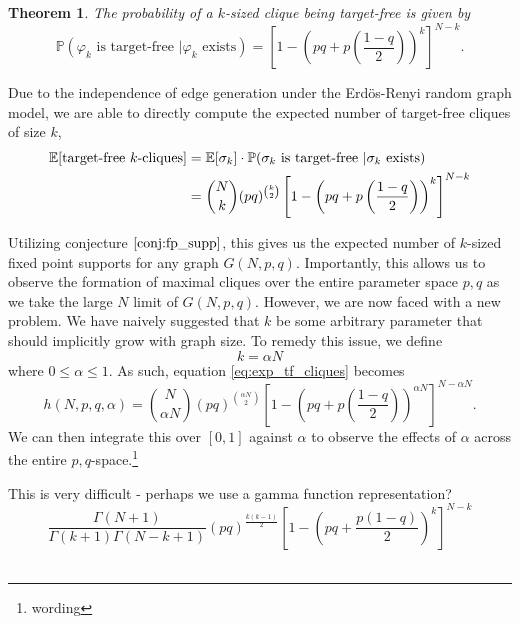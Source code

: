 \documentclass[psamsfonts]{amsart}
\newcommand{\E}{\mathbb{E}}
\newcommand{\PP}{\mathbb{P}}
\newtheorem{thm}{Theorem}[section]
\theoremstyle{definition}
\theoremstyle{remark}
\numberwithin{equation}{section}
\begin{document}
\begin{thm}
  The probability of a $k$-sized clique being target-free is given by
  \begin{equation}
    \label{eq:p_targetfree_directed}
    \PP(\varphi_k \mbox{ is target-free }|\varphi_k \mbox{ exists}) = \left[ 1- \left(pq + p   \left(\frac{1-q}{2} \right) \right)^k \right]^{N-k}.
  \end{equation}
\end{thm}

Due to the independence of edge generation under the Erd{\"o}s-Renyi random graph model, we are able to directly compute the expected number of target-free cliques of size $k$,
\begin{align}
  \label{eq:exp_tf_cliques}
  \E[\mbox{target-free } k\mbox{-cliques}] &= \E[\sigma_k] \cdot \PP(\sigma_k \mbox{ is target-free }|\sigma_k \mbox{ exists})
  \\
  & = \binom{N}{k}(pq)^{\binom{k}{2}} \left[ 1- \left(pq + p   \left(\frac{1-q}{2} \right) \right)^k \right]^{N-k} \notag
\end{align}

Utilizing conjecture $\ref{conj:fp_supp}$, this gives us the expected number of $k$-sized fixed point supports for any graph $G(N,p,q)$. Importantly, this allows us to observe the formation of maximal cliques over the entire parameter space $p,q$ as we take the large $N$ limit of $G(N,p,q)$. However, we are now faced with a new problem. We have naively suggested that $k$ be some arbitrary parameter that should implicitly grow with graph size. To remedy this issue, we define
\[
  k = \alpha N
\]
where $0\leq\alpha\leq1$. As such, equation \ref{eq:exp_tf_cliques} becomes
\begin{equation}
  \label{eq:exp_tf_w_a}
  h(N,p,q,\alpha) = \binom{N}{\alpha N}(pq)^{\binom{\alpha N}{2}} \left[ 1- \left(pq + p   \left(\frac{1-q}{2} \right) \right)^{\alpha N} \right]^{N-\alpha N}.
\end{equation}
We can then integrate this over $[0,1]$ against $\alpha$ to observe the effects of $\alpha$ across the entire $p,q$-space.\footnote{wording}

This is very difficult - perhaps we use a gamma function representation?
\[
  \frac{\Gamma(N+1)}{\Gamma(k+1)\Gamma(N-k+1)} (pq)^{\frac{k(k-1)}{2}} \left[ 1- \left(pq + \frac{p(1-q)}{2} \right)^k \right]^{N-k}
\]
\\
\end{document}
